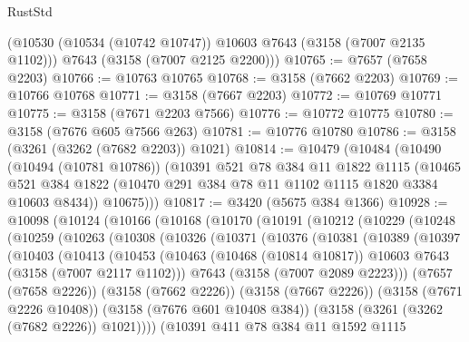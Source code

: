 \begin{lexlean}{RustStd}
\begin{coremodule}
      (@10530 (@10534 (@10742 @10747)) @10603 @7643 (@3158 (@7007 @2135 @1102)))
      @7643
      (@3158 (@7007 @2125 @2200)))
@10765 := @7657 (@7658 @2203)
@10766 := @10763 @10765
@10768 := @3158 (@7662 @2203)
@10769 := @10766 @10768
@10771 := @3158 (@7667 @2203)
@10772 := @10769 @10771
@10775 := @3158 (@7671 @2203 @7566)
@10776 := @10772 @10775
@10780 := @3158 (@7676 @605 @7566 @263)
@10781 := @10776 @10780
@10786 := @3158 (@3261 (@3262 (@7682 @2203)) @1021)
@10814 := @10479
    (@10484
      (@10490
        (@10494 (@10781 @10786))
        (@10391
          @521
          @78
          @384
          @11
          @1822
          @1115
          (@10465 @521 @384 @1822 (@10470 @291 @384 @78 @11 @1102 @1115 @1820 @3384 @10603 @8434))
          @10675)))
@10817 := @3420 (@5675 @384 @1366)
@10928 := @10098
    (@10124
      (@10166
        (@10168
          (@10170
            (@10191
              (@10212
                (@10229
                  (@10248
                    (@10259
                      (@10263
                        (@10308
                          (@10326
                            (@10371
                              (@10376
                                (@10381
                                  (@10389
                                    (@10397
                                      (@10403
                                        (@10413
                                          (@10453
                                            (@10463
                                              (@10468 (@10814 @10817))
                                              @10603
                                              @7643
                                              (@3158 (@7007 @2117 @1102)))
                                            @7643
                                            (@3158 (@7007 @2089 @2223)))
                                          (@7657 (@7658 @2226))
                                          (@3158 (@7662 @2226))
                                          (@3158 (@7667 @2226))
                                          (@3158 (@7671 @2226 @10408))
                                          (@3158 (@7676 @601 @10408 @384))
                                          (@3158 (@3261 (@3262 (@7682 @2226)) @1021))))
                                      (@10391
                                        @411
                                        @78
                                        @384
                                        @11
                                        @1592
                                        @1115

\end{coremodule}
\end{lexlean}
